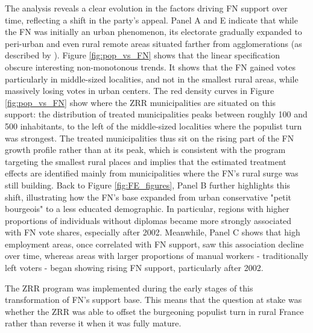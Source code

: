 The analysis reveals a clear evolution in the factors driving FN support over time, reflecting a shift in the party's appeal. Panel A and E indicate that while the FN was initially an urban phenomenon, its electorate gradually expanded to peri-urban and even rural remote areas situated farther from agglomerations (as described by \cite{Guilly2014}). Figure \ref{fig:pop_vs_FN} shows that the linear specification obscure interesting non-monotonous trends. It shows that the FN gained votes particularly in middle-sized localities, and not in the smallest rural areas, while massively losing votes in urban centers. The red density curves in Figure \ref{fig:pop_vs_FN} show where the ZRR municipalities are situated on this support: the distribution of treated municipalities peaks between roughly 100 and 500 inhabitants, to the left of the middle-sized localities where the populist turn was strongest. The treated municipalities thus sit on the rising part of the FN growth profile rather than at its peak, which is consistent with the program targeting the smallest rural places and implies that the estimated treatment effects are identified mainly from municipalities where the FN's rural surge was still building. Back to Figure \ref{fig:FE_figures}, Panel B further highlights this shift, illustrating how the FN's base expanded from urban conservative "petit bourgeois" to a less educated demographic. In particular, regions with higher proportions of individuals without diplomas became more strongly associated with FN vote shares, especially after 2002. Meanwhile, Panel C shows that high employment areas, once correlated with FN support, saw this association decline over time, whereas areas with larger proportions of manual workers - traditionally left voters - began showing rising FN support, particularly after 2002. 


The ZRR program was implemented during the early stages of this transformation of FN's support base. This means that the question at stake was whether the ZRR was able to offset the burgeoning populist turn in rural France rather than reverse it when it was fully mature.

